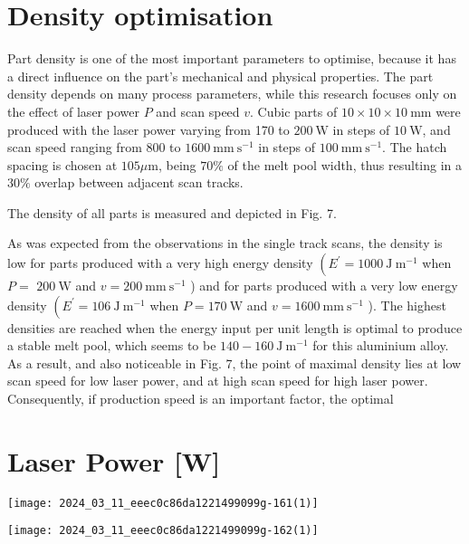 \documentclass[10pt]{article}
\begin{document}
\section*{Density optimisation}
Part density is one of the most important parameters to optimise, because it has a direct influence on the part's mechanical and physical properties. The part density depends on many process parameters, while this research focuses only on the effect of laser power $P$ and scan speed $v$. Cubic parts of $10 \times 10 \times 10 \mathrm{~mm}$ were produced with the laser power varying from 170 to $200 \mathrm{~W}$ in steps of $10 \mathrm{~W}$, and scan speed ranging from 800 to $1600 \mathrm{~mm} \mathrm{~s}^{-1}$ in steps of $100 \mathrm{~mm} \mathrm{~s}^{-1}$. The hatch spacing is chosen at $105 \mu \mathrm{m}$, being $70 \%$ of the melt pool width, thus resulting in a $30 \%$ overlap between adjacent scan tracks.

The density of all parts is measured and depicted in Fig. 7.

As was expected from the observations in the single track scans, the density is low for parts produced with a very high energy density $\left(E^{\prime}=1000 \mathrm{~J} \mathrm{~m}^{-1}\right.$ when $P=$ $200 \mathrm{~W}$ and $v=200 \mathrm{~mm} \mathrm{~s}^{-1}$ ) and for parts produced with a very low energy density $\left(E^{\prime}=106 \mathrm{~J} \mathrm{~m}^{-1}\right.$ when $P=170 \mathrm{~W}$ and $v=1600 \mathrm{~mm} \mathrm{~s}^{-1}$ ). The highest densities are reached when the energy input per unit length is optimal to produce a stable melt pool, which seems to be $140-160 \mathrm{~J} \mathrm{~m}^{-1}$ for this aluminium alloy. As a result, and also noticeable in Fig. 7, the point of maximal density lies at low scan speed for low laser power, and at high scan speed for high laser power. Consequently, if production speed is an important factor, the optimal

\section*{Laser Power [W]}
\begin{center}
\texttt{[image: 2024\_03\_11\_eeec0c86da1221499099g-161(1)]}
\end{center}

\begin{center}
\texttt{[image: 2024\_03\_11\_eeec0c86da1221499099g-162(1)]}
\end{center}
\end{document}
